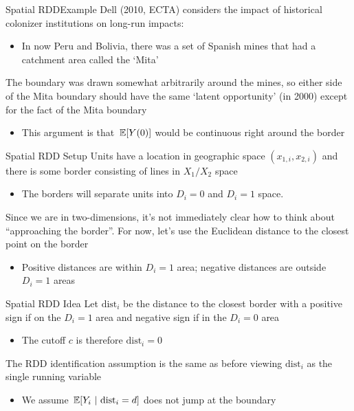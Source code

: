 \documentclass[aspectratio=169,t,11pt,table]{beamer}
\begin{document}
\begin{frame}{Spatial RDD}{Example}
  Dell (2010, ECTA) considers the impact of historical colonizer institutions on long-run impacts:
  \begin{itemize}
    \item In now Peru and Bolivia, there was a set of Spanish mines that had a catchment area called the `Mita'
  \end{itemize}

  \bigskip
  The boundary was drawn somewhat arbitrarily around the mines, so either side of the Mita boundary should have the same `latent opportunity' (in 2000) except for the fact of the Mita boundary 
  \begin{itemize}
    \item This argument is that $\expec{Y(0)}$ would be continuous right around the border 
  \end{itemize}
\end{frame}


\begin{frame}{Spatial RDD Setup}
  Units have a location in geographic space $(x_{1,i}, x_{2,i})$ and there is some border consisting of lines in $X_1/X_2$ space

  \begin{itemize}
    \item The borders will separate units into $D_i = 0$ and $D_i = 1$ space.
  \end{itemize}

  \pause
  \bigskip
  Since we are in two-dimensions, it's not immediately clear how to think about ``approaching the border''. For now, let's use the Euclidean distance to the closest point on the border
  \begin{itemize}
    \item Positive distances are within $D_i = 1$ area; negative distances are outside $D_i = 1$ areas
  \end{itemize}
\end{frame}

\begin{frame}{Spatial RDD Idea}
  Let $\text{dist}_i$ be the distance to the closest border with a positive sign if on the $D_i = 1$ area and negative sign if in the $D_i = 0$ area
  \begin{itemize}
    \item The cutoff $c$ is therefore $\text{dist}_i = 0$
  \end{itemize}

  \bigskip
  The RDD identification assumption is the same as before viewing $\text{dist}_i$ as the single running variable
  \begin{itemize}
    \item We assume $\expec{Y_i}{\text{dist}_i = d}$ does not jump at the boundary
  \end{itemize}
\end{frame}
\end{document}
